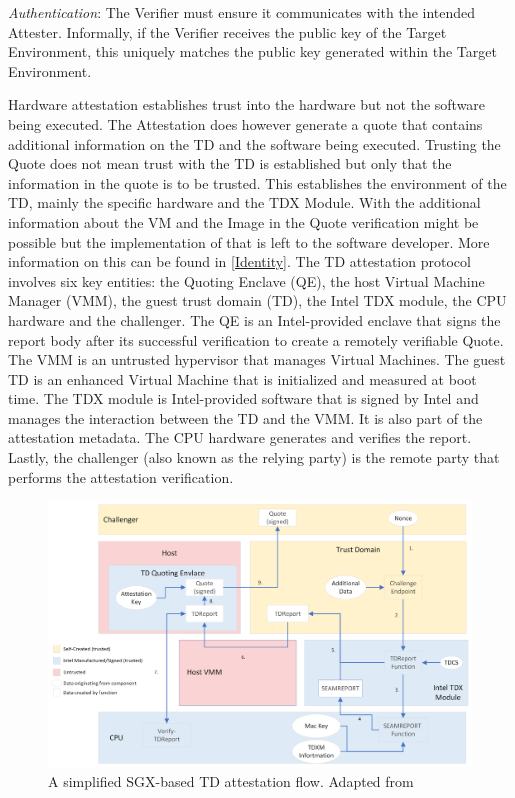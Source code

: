 \textit{Authentication}: The Verifier must ensure it communicates with the intended Attester. Informally, if the Verifier receives the public key of the Target Environment, this uniquely matches the public key generated within the Target Environment.

Hardware attestation establishes trust into the hardware but not the software being executed. The Attestation does however generate a quote that contains additional information on the TD and the software being executed. Trusting the Quote does not mean trust with the TD is established but only that the information in the quote is to be trusted. This establishes the environment of the TD, mainly the specific hardware and the TDX Module. With the additional information about the VM and the Image in the Quote verification might be possible but the implementation of that is left to the software developer. More information on this can be found in \ref{Identity}.
The TD attestation protocol involves six key entities: the Quoting Enclave (QE), the host Virtual Machine Manager (VMM), the guest trust domain (TD), the Intel TDX module, the CPU hardware and the challenger. The QE is an Intel-provided enclave that signs the report body after its successful verification to create a remotely verifiable Quote. The VMM is an untrusted hypervisor that manages Virtual Machines. The guest TD is an enhanced Virtual Machine that is initialized and measured at boot time. The TDX module is Intel-provided software that is signed by Intel and manages the interaction between the TD and the VMM. It is also part of the attestation metadata. The CPU hardware generates and verifies the report. Lastly, the challenger (also known as the relying party) is the remote party that performs the attestation verification.
\begin{figure}
\centering
\includegraphics[width=\textwidth]{figures/Attestation-einfach.png}
\caption{A simplified SGX-based TD attestation flow. Adapted from \cite[p.~111]{tdx-module-10-public-specpdf_nodate}}
\label{fig:EasyAttestation}
\end{figure}
